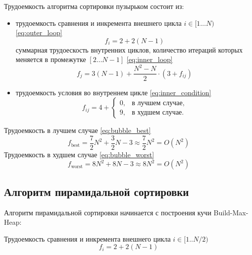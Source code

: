 Трудоемкость алгоритма сортировки пузырьком состоит из:
\begin{itemize}
    \item трудоемкость сравнения и инкремента внешнего цикла $i \in [1\dots N)$ \ref{eq:outer_loop} \begin{equation}
        f_i = 2 + 2(N - 1)
        \label{eq:outer_loop}
    \end{equation}
    суммарная трудоескость внутренних циклов, количество итераций которых меняется в промежутке $[2\dots N - 1]$ \ref{eq:inner_loop} \begin{equation}
        f_j = 3(N - 1) + \dfrac{N^2 - N}{2} \cdot(3 + f_{ij})
        \label{eq:inner_loop}
    \end{equation}
    \item трудоемкость условия во внутреннем цикле \ref{eq:inner_condition} \begin{equation}
        f_{ij} = 4 +         
        \begin{cases}
            0, & \text{в лучшем случае},\\
            9,& \text{в худшем случае}.
        \end{cases}
        \label{eq:inner_condition}
    \end{equation}
\end{itemize}

Трудоемкость в лучшем случае \ref{eq:bubble_best}
\begin{equation}
    f_{\text{best}} = \frac{7}{2}N^2 + \frac{3}{2}N - 3 \approx \frac{7}{2}N^2 = O(N^2)
    \label{eq:bubble_best}
\end{equation}
Трудоемкость в худшем случае \ref{eq:bubble_worst}
\begin{equation}
    f_{\text{worst}} = 8N^2 + 8N - 3 \approx 8N^2 = O(N^2)
    \label{eq:bubble_worst}
\end{equation}

\subsection{Алгоритм пирамидальной сортировки}

Алгоритм пирамидальной сортировки начинается с построения кучи Build-Max-Heap:

Трудоемкость сравнения и инкремента внешнего цикла $i \in [1..N / 2)$
\begin{equation}
    f_i = 2 + 2(N - 1)
    \label{eq:heap_outer}
\end{equation}

